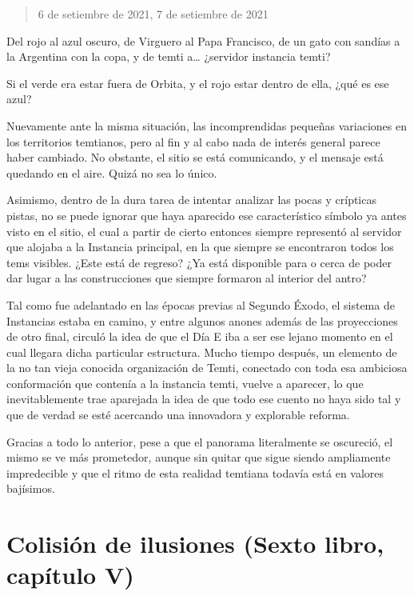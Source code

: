 \documentclass[
]{book}
\begin{document}
\begin{quote}
6 de setiembre de 2021, 7 de setiembre de 2021
\end{quote}

Del rojo al azul oscuro, de Virguero al Papa Francisco, de un gato con sandías a la Argentina con la copa, y de temti a\ldots{} ¿servidor instancia temti?

Si el verde era estar fuera de Orbita, y el rojo estar dentro de ella, ¿qué es ese azul?

Nuevamente ante la misma situación, las incomprendidas pequeñas variaciones en los territorios temtianos, pero al fin y al cabo nada de interés general parece haber cambiado. No obstante, el sitio se está comunicando, y el mensaje está quedando en el aire. Quizá no sea lo único.

Asimismo, dentro de la dura tarea de intentar analizar las pocas y crípticas pistas, no se puede ignorar que haya aparecido ese característico símbolo ya antes visto en el sitio, el cual a partir de cierto entonces siempre representó al servidor que alojaba a la Instancia principal, en la que siempre se encontraron todos los tems visibles. ¿Este está de regreso? ¿Ya está disponible para o cerca de poder dar lugar a las construcciones que siempre formaron al interior del antro?

Tal como fue adelantado en las épocas previas al Segundo Éxodo, el sistema de Instancias estaba en camino, y entre algunos anones además de las proyecciones de otro final, circuló la idea de que el Día E iba a ser ese lejano momento en el cual llegara dicha particular estructura. Mucho tiempo después, un elemento de la no tan vieja conocida organización de Temti, conectado con toda esa ambiciosa conformación que contenía a la instancia temti, vuelve a aparecer, lo que inevitablemente trae aparejada la idea de que todo ese cuento no haya sido tal y que de verdad se esté acercando una innovadora y explorable reforma.

Gracias a todo lo anterior, pese a que el panorama literalmente se oscureció, el mismo se ve más prometedor, aunque sin quitar que sigue siendo ampliamente impredecible y que el ritmo de esta realidad temtiana todavía está en valores bajísimos.

\hypertarget{colisiuxf3n-de-ilusiones-sexto-libro-capuxedtulo-v}{%
\section{Colisión de ilusiones (Sexto libro, capítulo V)}\label{colisiuxf3n-de-ilusiones-sexto-libro-capuxedtulo-v}}
\end{document}
